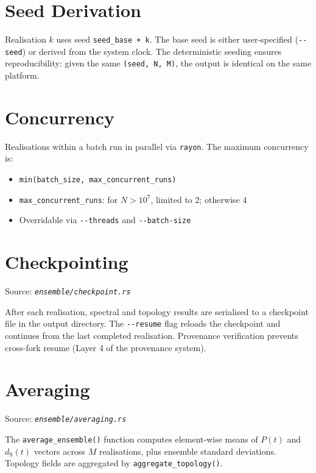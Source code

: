 \documentclass[11pt, a4paper, openany]{book}
\newcommand{\dS}{d_{\mathrm{S}}}
\newcommand{\code}[1]{\texttt{#1}}
\newcommand{\func}[1]{\texttt{\color{structure}#1}}
\newcommand{\flag}[1]{\texttt{-{}-#1}}
\newcommand{\file}[1]{\texttt{\itshape #1}}
\begin{document}
\section{Seed Derivation}

Realisation $k$ uses seed \code{seed\_base + k}.  The base seed is either
user-specified (\flag{seed}) or derived from the system clock.  The
deterministic seeding ensures reproducibility: given the same
\code{(seed, N, M)}, the output is identical on the same platform.

\section{Concurrency}

Realisations within a batch run in parallel via \code{rayon}.  The maximum
concurrency is:
\begin{itemize}
  \item \code{min(batch\_size, max\_concurrent\_runs)}
  \item \code{max\_concurrent\_runs}: for $N > 10^7$, limited to 2; otherwise 4
  \item Overridable via \flag{threads} and \flag{batch-size}
\end{itemize}

\section{Checkpointing}

Source: \file{ensemble/checkpoint.rs}

After each realisation, spectral and topology results are serialised to a
checkpoint file in the output directory.  The \flag{resume} flag reloads the
checkpoint and continues from the last completed realisation.  Provenance
verification prevents cross-fork resume (Layer 4 of the provenance system).

\section{Averaging}

Source: \file{ensemble/averaging.rs}

The \func{average\_ensemble()} function computes element-wise means of
$P(t)$ and $\dS(t)$ vectors across $M$ realisations, plus ensemble standard
deviations.  Topology fields are aggregated by \func{aggregate\_topology()}.


\end{document}
